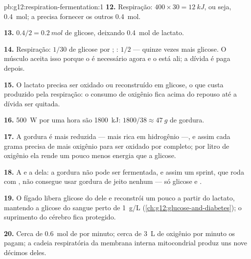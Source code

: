 \begin{solution}{pb:g12:respiration-fermentation:1}
\textbf{12.} Respiração: $400 \times 30 = \qty{12}{kJ}$, ou seja,
\qty{0.4}{mol}; a  precisa fornecer os outros \qty{0.4}{mol}.

\textbf{13.} $0.4/2 = \qty{0.2}{mol}$ de glicose, deixando \qty{0.4}{mol}
de lactato.

\textbf{14.} Respiração: $1/30$ de glicose por ; : $1/2$
--- quinze vezes mais glicose. O músculo aceita isso porque o  é
necessário agora e o  está ali; a dívida é paga depois.

\textbf{15.} O lactato precisa ser oxidado ou reconstruído em glicose,
o que custa  produzido pela respiração: o consumo de oxigênio fica
acima do repouso até a dívida ser quitada.

\textbf{16.} \qty{500}{W} por uma hora são \qty{1800}{kJ}: $1800/38
\approx \qty{47}{g}$ de gordura.

\textbf{17.} A gordura é mais reduzida --- mais rica em hidrogênio ---,
e assim cada grama precisa de mais oxigênio para ser oxidado por
completo; por litro de oxigênio ela rende um pouco menos energia que a glicose.

\textbf{18.} A  e a  dela: a gordura não pode ser
fermentada, e assim um sprint, que roda com , não consegue
usar gordura de jeito nenhum --- só glicose e .

\textbf{19.} O fígado libera glicose do  dele e reconstrói um
pouco a partir do lactato, mantendo a glicose do sangue perto de
\qty{1}{g/L} (\cref{ch:g12:glucose-and-diabetes}); o suprimento do
cérebro fica protegido.

\textbf{20.} Cerca de \qty{0.6}{mol} de  por minuto; cerca de
\qty{3}{L} de oxigênio por minuto os pagam; a cadeia respiratória da
membrana interna mitocondrial produz uns nove décimos deles.
\end{solution}
